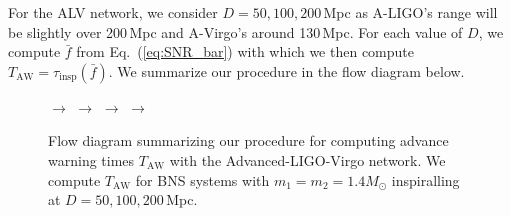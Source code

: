 \documentclass[prd,amsmath,amssymb,aps,floats,amsfonts,notitlepage,superscriptaddress,eqsecnum,nofootinbib,10pt]{revtex4-1}
\begin{document}
For the ALV network, we consider $D=50,100,200\,$Mpc 
 as A-LIGO's range will be slightly over 200\,Mpc and A-Virgo's around 130\,Mpc.
 For each value of $D$, we compute $\bar{f}$ from Eq.~(\ref{eq:SNR_bar}) with which we then compute $T_\text{AW}=\tau_\text{insp}(\bar{f})$.
 We summarize our procedure in the flow diagram below.
  \begin{figure}[ht!]
 $\longrightarrow$ 
 $\longrightarrow$   $\longrightarrow$  
 $\longrightarrow$  
  \caption{Flow diagram summarizing our procedure for computing advance warning times $T_\text{AW}$ with the Advanced-LIGO-Virgo network. 
  We compute $T_\text{AW}$ for BNS systems with $m_1=m_2=1.4M_\odot$ inspiralling at $D=50,100,200\,$Mpc. 
  }\label{fig:flow}
\end{figure}
\end{document}
